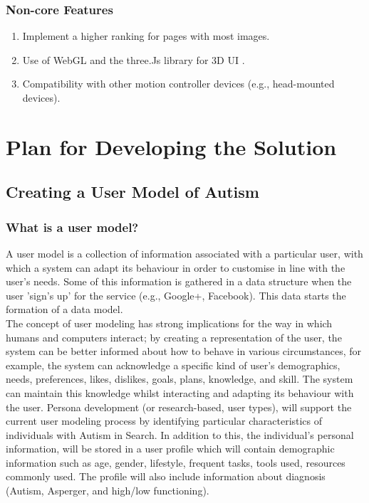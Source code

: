 \documentclass[10pt]{article}
\begin{document}
\subsubsection{Non-core Features}
\begin{enumerate}

\item Implement a higher ranking for pages with most images. 
\item Use of WebGL and the three.Js library for 3D UI .
\item Compatibility with other motion controller devices (e.g., head-mounted devices).

\end{enumerate}

\section{Plan for Developing the Solution}

\subsection {Creating a User Model of Autism}\label{usermodel}
\subsubsection{What is a user model?}
A user model is a collection of information associated with a particular user, with which a system can adapt its behaviour in order to customise in line with the user’s needs. Some of this information is gathered in a data structure when the user 'sign's up' for the service (e.g., Google+, Facebook). This data starts the formation of a data model. \\The concept of user modeling has strong implications for the way in which humans and computers interact; by creating a representation of the user, the system can be better informed about how to behave in various circumstances, for example, the system can acknowledge a specific kind of user’s demographics, needs, preferences, likes, dislikes, goals, plans, knowledge, and skill. The system can maintain this knowledge whilst interacting and adapting its behaviour with the user.
Persona development (or research-based, user types), will support the current user modeling process by identifying particular characteristics of individuals with Autism in Search. In addition to this, the individual’s personal information, will be stored in a user profile which will contain demographic information such as age, gender, lifestyle, frequent tasks, tools used, resources commonly used. The profile will also include information about diagnosis (Autism, Asperger, and high/low functioning).
\end{document}
